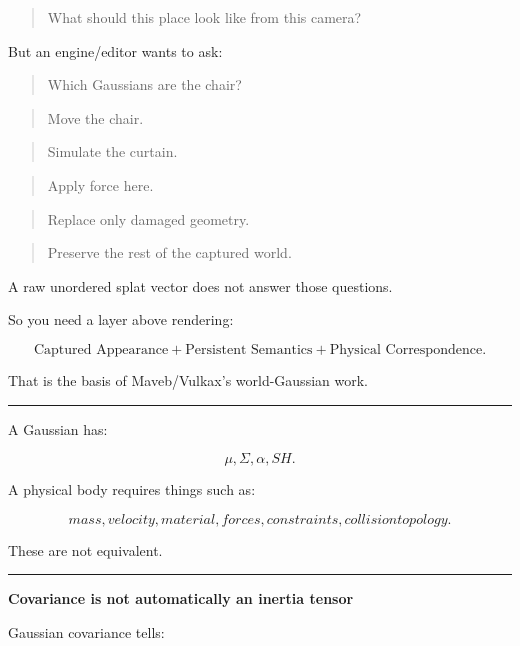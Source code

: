 \begin{quote}
What should this place look like from this camera?
\end{quote}

But an engine/editor wants to ask:

\begin{quote}
Which Gaussians are the chair?
\end{quote}

\begin{quote}
Move the chair.
\end{quote}

\begin{quote}
Simulate the curtain.
\end{quote}

\begin{quote}
Apply force here.
\end{quote}

\begin{quote}
Replace only damaged geometry.
\end{quote}

\begin{quote}
Preserve the rest of the captured world.
\end{quote}

A raw unordered splat vector does not answer those questions.

So you need a layer above rendering:

\[
\boxed{
\text{Captured Appearance}
+
\text{Persistent Semantics}
+
\text{Physical Correspondence}.
}
\]

That is the basis of Maveb/Vulkax's world-Gaussian work.

\begin{center}\rule{0.5\linewidth}{0.5pt}\end{center}

A Gaussian has:

\[
\mu,
\Sigma,
\alpha,
SH.
\]

A physical body requires things such as:

\[
mass,
velocity,
material,
forces,
constraints,
collision topology.
\]

These are not equivalent.

\begin{center}\rule{0.5\linewidth}{0.5pt}\end{center}

\textbf{Covariance is not automatically an inertia tensor}

Gaussian covariance tells:

